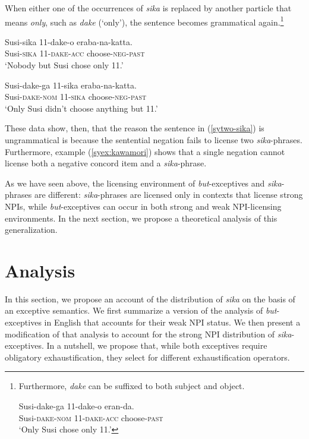 \documentclass[output=paper]{langscibook}
\begin{document}
When either one of the occurrences of \emph{sika} is replaced by another particle that means \emph{only}, such as \emph{dake} (`only'), the sentence becomes grammatical again.\footnote{Furthermore, \emph{dake} can be suffixed to both subject and object.

\ea \gll Susi-dake-ga 11-dake-o eran-da.\\
Susi-\textsc{dake}-\textsc{nom} 11-\textsc{dake}-\textsc{acc} choose-\textsc{past}\\
\glt `Only Susi chose only 11.'\z}

\ea \gll Susi-sika 11-dake-o eraba-na-katta.\\
Susi-\textsc{sika} 11-\textsc{dake}-\textsc{acc} choose-\textsc{neg}-\textsc{past}\\
\glt `Nobody but Susi chose only 11.'\

\ex \gll Susi-dake-ga 11-sika eraba-na-katta.\\
Susi-\textsc{dake}-\textsc{nom} 11-\textsc{sika} choose-\textsc{neg}-\textsc{past}\\
\glt `Only Susi didn't choose anything but 11.'\z

These data show, then, that the reason the sentence in (\ref{sytwo-sika}) is ungrammatical is because the sentential negation fails to license two \emph{sika}-phrases.  
Furthermore, example (\ref{syex:kawamori}) shows that a single negation cannot license both a negative concord item and a \emph{sika}-phrase.

\begin{sloppypar}
As we have seen above, the licensing environment of \emph{but}-exceptives and \emph{sika}-phrases are different: \emph{sika}-phrases are licensed only in contexts that license strong NPIs, while \emph{but}-exceptives can occur in both strong and weak NPI-li\-cens\-ing environments.  In the next section, we propose a theoretical analysis of this generalization.
\end{sloppypar}

\section{Analysis}\label{sysc:analysis}

In this section, we propose an account of the distribution of \emph{sika} on the basis of an exceptive semantics.
We first summarize a version of the analysis of \emph{but}-exceptives in English that accounts for their weak NPI status.
We then present a modification of that analysis to account for the strong NPI distribution of \emph{sika}-exceptives. In a nutshell, we propose that, while both exceptives require obligatory exhaustification, they select for different exhaustification operators.
\end{document}
